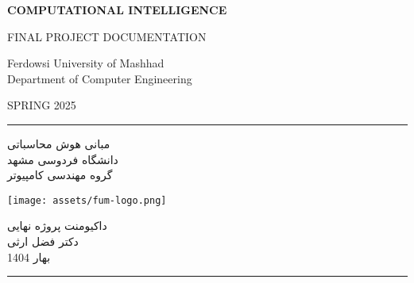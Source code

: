 \documentclass[a4paper,12pt]{article}
\begin{document}
	\begin{latin}
		\begin{titlepage}
			\thispagestyle{empty}
			\pagecolor{titlepagecolor}
			\color{white}
			\begin{center}
				
				{\fontsize{48}{0}\bfseries\selectfont \color{CustomAccent} COMPUTATIONAL INTELLIGENCE}
				
				\baselineskip
				{\fontsize{24}{0}\selectfont FINAL PROJECT DOCUMENTATION}
				
				
				{\fontsize{20}{0}\selectfont \color{CustomAccent}
					Ferdowsi University of Mashhad \\
					Department of Computer Engineering
				}
				
				\baselineskip
				{\Large SPRING 2025}
				
			\end{center}
		\end{titlepage}
	\end{latin}
	
	\clearpage
	\nopagecolor
	\pagecolor{CustomBackground}
	\color{white}
	
	\hrule \medskip
	\begin{minipage}{0.295\textwidth}
		\raggedleft \color{CustomAccent}
		مبانی هوش محاسباتی\\
		دانشگاه فردوسی مشهد\\
		گروه مهندسی کامپیوتر
	\end{minipage}
	\begin{minipage}{0.4\textwidth}
		\centering 
		\texttt{[image: assets/fum-logo.png]}
	\end{minipage}
	\begin{minipage}{0.295\textwidth} \color{CustomAccent}
		داکیومنت پروژه نهایی \\
		دکتر فضل ارثی \\
		بهار 1404
	\end{minipage}
	\medskip\hrule
	\bigskip	
	
\end{document}
